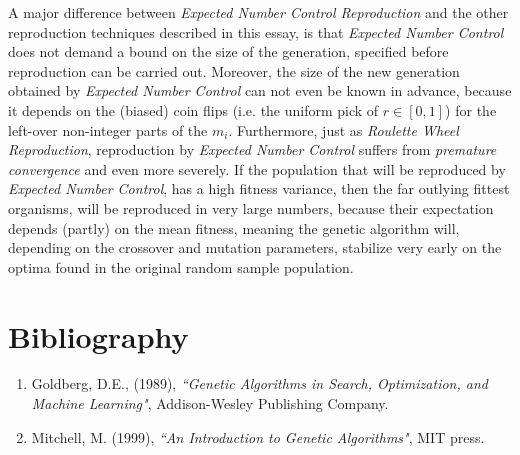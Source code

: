 \documentclass[a4paper]{article}
\theoremstyle{dotless}
\begin{document}
A major difference between \emph{Expected Number Control Reproduction} and the other reproduction techniques described in this essay, is that \emph{Expected Number Control} does not demand a bound on the size of the generation, specified before reproduction can be carried out. Moreover, the size of the new generation obtained by \emph{Expected Number Control} can not even be known in advance, because it depends on the (biased) coin flips (i.e. the uniform pick of $r \in [0,1]$) for the left-over non-integer parts of the $m_i$. Furthermore, just as \emph{Roulette Wheel Reproduction}, reproduction by \emph{Expected Number Control} suffers from \emph{premature convergence} and even more severely. If the population that will be reproduced by \emph{Expected Number Control}, has a high fitness variance, then the far outlying fittest organisms, will be reproduced in very large numbers, because their expectation depends (partly) on the mean fitness, meaning the genetic algorithm will, depending on the crossover and mutation parameters, stabilize very early on the optima found in the original random sample population.

\section{Bibliography}

\begin{enumerate}
\item Goldberg, D.E., (1989), \textit{``Genetic Algorithms in
Search, Optimization, and Machine Learning"}, Addison-Wesley Publishing Company.
\item Mitchell, M. (1999), \textit{``An Introduction to Genetic Algorithms"}, MIT press.
\end{enumerate}
\end{document}
